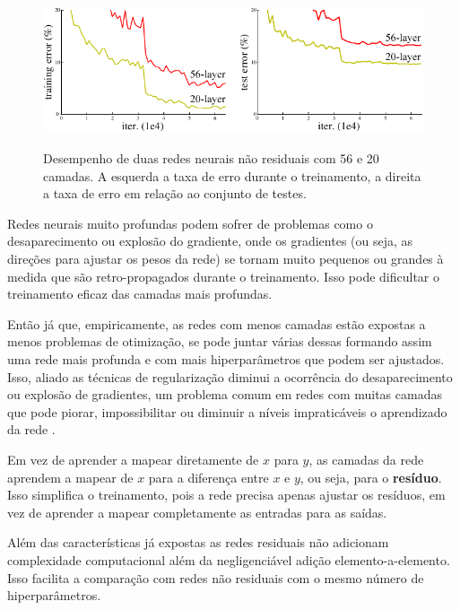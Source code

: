 			\begin{figure}[H]
				\centering
				\caption[Comparação de redes profundas não residuais]{Desempenho de duas redes neurais não residuais com 56 e 20 camadas. A esquerda a taxa de erro durante o treinamento, a direita a taxa de erro em relação ao conjunto de testes.}
				\includegraphics[width=0.7\linewidth]{images/teaser}
				\label{fig:teaser}
			\end{figure}
			
			\par Redes neurais muito profundas podem sofrer de problemas como o desaparecimento ou explosão do gradiente, onde os gradientes (ou seja, as direções para ajustar os pesos da rede) se tornam muito pequenos ou grandes à medida que são retro-propagados durante o treinamento. Isso pode dificultar o treinamento eficaz das camadas mais profundas.

			\par Então já que, empiricamente, as redes com menos camadas estão expostas a menos problemas de otimização, se pode juntar várias dessas formando assim uma rede mais profunda e com mais hiperparâmetros que podem ser ajustados. Isso, aliado as técnicas de regularização diminui a ocorrência do desaparecimento ou explosão de gradientes, um problema comum em redes com muitas camadas que pode piorar, impossibilitar ou diminuir a níveis impraticáveis o aprendizado da rede \cite{DBLP:journals/corr/HeZRS15}. 
			
			\par Em vez de aprender a mapear diretamente de $x$ para $y$, as camadas da rede aprendem a mapear de $x$ para a diferença entre $x$ e $y$, ou seja, para o \textbf{resíduo}. Isso simplifica o treinamento, pois a rede precisa apenas ajustar os resíduos, em vez de aprender a mapear completamente as entradas para as saídas.
			
			\par Além das características já expostas as redes residuais não adicionam complexidade computacional além da negligenciável adição elemento-a-elemento. Isso facilita a comparação com redes não residuais com o mesmo número de hiperparâmetros.
			
